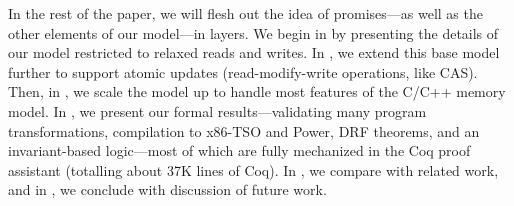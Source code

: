 



In the rest of the paper, we will flesh out the idea of promises---as
well as the other elements of our model---in layers.  We begin in
 by presenting the details of our model restricted
to relaxed reads and writes.  In , we extend this
base model further to support atomic updates (\ie read-modify-write
operations, like CAS).  Then, in , we scale the model
up to handle most features of the C/C++ memory model.  In
, we present our formal results---validating many
program transformations, compilation to x86-TSO and Power, DRF
theorems, and an invariant-based logic---most of which are fully
mechanized in the Coq proof assistant (totalling about 37K lines of
Coq).  In , we compare with related work, and in
, we conclude with discussion of future work.


